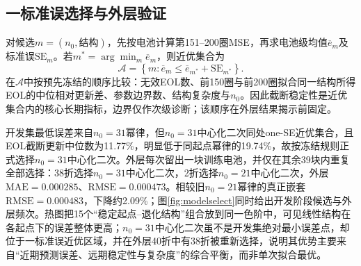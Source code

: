 \documentclass[withoutpreface]{cumcmthesis}
\newcommand{\RMSE}{\mathrm{RMSE}}
\newcommand{\MAE}{\mathrm{MAE}}
\begin{document}
\subsection{一标准误选择与外层验证}

对候选$m=(n_0,\text{结构})$，先按电池计算第151--200圈MSE，再求电池级均值$\overline e_m$及标准误$\mathrm{SE}_m$。若$m^*=\arg\min_m\overline e_m$，则近优集合为
\begin{equation}
\mathcal A=\left\{m:\overline e_m\le
\overline e_{m^*}+\mathrm{SE}_{m^*}\right\}.
\end{equation}
在$\mathcal A$中按预先冻结的顺序比较：无效EOL数、前150圈与前200圈拟合同一结构所得EOL的中位相对更新差、参数边界数、结构复杂度与$n_0$。因此截断稳定性是近优集合内的核心长期指标，边界仅作次级诊断；该顺序在外层结果揭示前固定。

\begin{table}[H]
\centering
{}
\label{tab:q1models}
\end{table}

开发集最低误差来自$n_0=31$幂律，但$n_0=31$中心化二次同处one-SE近优集合，且EOL截断更新中位数为11.77\%，明显低于同起点幂律的19.74\%，故按冻结规则正式选择$n_0=31$中心化二次。外层每次留出一块训练电池，并仅在其余39块内重复全部选择：38折选择$n_0=31$中心化二次，2折选择$n_0=21$中心化二次，外层$\MAE=0.000285$、$\RMSE=0.000473$。相较旧$n_0=21$幂律的真正嵌套$\RMSE=0.000483$，下降约2.09\%；图\ref{fig:modelselect}同时给出开发阶段候选与外层频次。热图把15个“稳定起点--退化结构”组合放到同一色阶中，可见线性结构在各起点下的误差整体更高；$n_0=31$中心化二次虽不是开发集绝对最小误差点，却位于一标准误近优区域，并在外层40折中有38折被重新选择，说明其优势主要来自“近期预测误差、远期稳定性与复杂度”的综合平衡，而非单次拟合最优。
\end{document}
